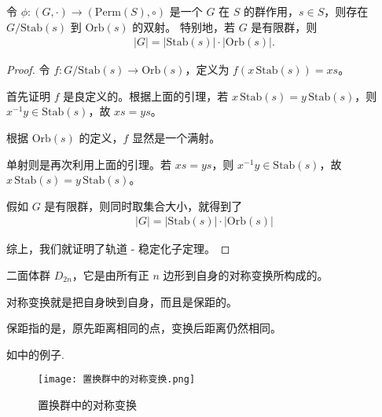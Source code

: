 \documentclass[../../main.tex]{subfiles}
\begin{document}
\begin{theorem}[轨道 - 稳定化子定理]\label{theorem:轨道 - 稳定化子定理}
令 $\phi:(G,\cdot)\to(\mathrm{Perm}(S),\circ)$ 是一个 $G$ 在 $S$ 的群作用，$s\in S$，则存在 $G/\mathrm{Stab}(s)$ 到 $\mathrm{Orb}(s)$ 的双射。
特别地，若 $G$ 是有限群，则
\begin{align*}
|G| = |\mathrm{Stab}(s)|\cdot|\mathrm{Orb}(s)|.
\end{align*}
\end{theorem}
\begin{proof}
令 $f:G/\mathrm{Stab}(s)\to\mathrm{Orb}(s)$，定义为 $f(x\,\mathrm{Stab}(s)) = xs$。

首先证明 $f$ 是良定义的。根据上面的引理，若 $x\,\mathrm{Stab}(s)=y\,\mathrm{Stab}(s)$，则 $x^{-1}y\in\mathrm{Stab}(s)$，故 $xs = ys$。

根据 $\mathrm{Orb}(s)$ 的定义，$f$ 显然是一个满射。

单射则是再次利用上面的引理。若 $xs = ys$，则 $x^{-1}y\in\mathrm{Stab}(s)$，故 $x\,\mathrm{Stab}(s)=y\,\mathrm{Stab}(s)$。

假如 $G$ 是有限群，则同时取集合大小，就得到了
\begin{align*}
|G| = |\mathrm{Stab}(s)|\cdot|\mathrm{Orb}(s)|
\end{align*}

综上，我们就证明了轨道 - 稳定化子定理。 
\end{proof}


\begin{definition}
二面体群 $D_{2n}$，它是由所有正 $n$ 边形到自身的对称变换所构成的。

对称变换就是把自身映到自身，而且是保距的。

保距指的是，原先距离相同的点，变换后距离仍然相同。
\end{definition}
\begin{note}
如中的例子. 
\begin{figure}[H]
\centering
\texttt{[image: 置换群中的对称变换.png]}
\caption{置换群中的对称变换}
\label{figure:置换群中的对称变换}
\end{figure}
\end{note}
\end{document}
